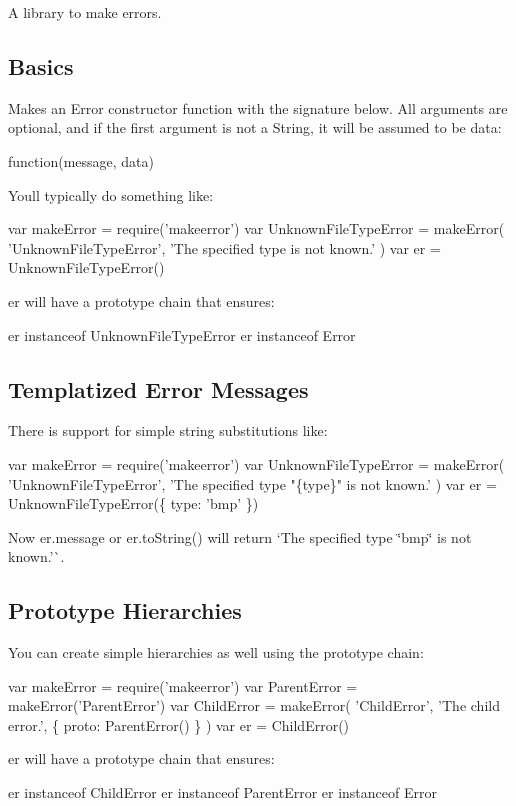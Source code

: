 A library to make errors.

\subsection*{Basics }

Makes an Error constructor function with the signature below. All arguments are optional, and if the first argument is not a {\ttfamily String}, it will be assumed to be {\ttfamily data}\+:


\begin{DoxyCode}
function(message, data)
\end{DoxyCode}


You\textquotesingle{}ll typically do something like\+:


\begin{DoxyCode}
var makeError = require('makeerror')
var UnknownFileTypeError = makeError(
  'UnknownFileTypeError',
  'The specified type is not known.'
)
var er = UnknownFileTypeError()
\end{DoxyCode}


{\ttfamily er} will have a prototype chain that ensures\+:


\begin{DoxyCode}
er instanceof UnknownFileTypeError
er instanceof Error
\end{DoxyCode}


\subsection*{Templatized Error Messages }

There is support for simple string substitutions like\+:


\begin{DoxyCode}
var makeError = require('makeerror')
var UnknownFileTypeError = makeError(
  'UnknownFileTypeError',
  'The specified type "\{type\}" is not known.'
)
var er = UnknownFileTypeError(\{ type: 'bmp' \})
\end{DoxyCode}


Now {\ttfamily er.\+message} or {\ttfamily er.\+to\+String()} will return `\textquotesingle{}The specified type \char`\"{}bmp\char`\"{} is not known.'\`{}.

\subsection*{Prototype Hierarchies }

You can create simple hierarchies as well using the {\ttfamily prototype} chain\+:


\begin{DoxyCode}
var makeError = require('makeerror')
var ParentError = makeError('ParentError')
var ChildError = makeError(
  'ChildError',
  'The child error.',
  \{ proto: ParentError() \}
)
var er = ChildError()
\end{DoxyCode}


{\ttfamily er} will have a prototype chain that ensures\+:


\begin{DoxyCode}
er instanceof ChildError
er instanceof ParentError
er instanceof Error
\end{DoxyCode}
 